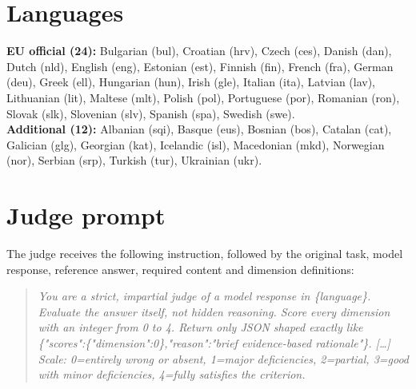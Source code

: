 \documentclass[11pt]{article}
\begin{document}



\appendix
\section{Languages}
\label{app:languages}
\small
\noindent\textbf{EU official (24):} Bulgarian (bul), Croatian (hrv), Czech (ces), Danish (dan), Dutch (nld), English (eng), Estonian (est), Finnish (fin), French (fra), German (deu), Greek (ell), Hungarian (hun), Irish (gle), Italian (ita), Latvian (lav), Lithuanian (lit), Maltese (mlt), Polish (pol), Portuguese (por), Romanian (ron), Slovak (slk), Slovenian (slv), Spanish (spa), Swedish (swe).\\
\textbf{Additional (12):} Albanian (sqi), Basque (eus), Bosnian (bos), Catalan (cat), Galician (glg), Georgian (kat), Icelandic (isl), Macedonian (mkd), Norwegian (nor), Serbian (srp), Turkish (tur), Ukrainian (ukr).
\normalsize

\section{Judge prompt}
\label{app:judge}
The judge receives the following instruction, followed by the original task, model response, reference answer, required content and dimension definitions:
\begin{quote}\small
\textit{You are a strict, impartial judge of a model response in \{language\}. Evaluate the answer itself, not hidden reasoning. Score every dimension with an integer from 0 to 4. Return only JSON shaped exactly like \{"scores":\{"dimension":0\},"reason":"brief evidence-based rationale"\}. [\ldots] Scale: 0=entirely wrong or absent, 1=major deficiencies, 2=partial, 3=good with minor deficiencies, 4=fully satisfies the criterion.}
\end{quote}
\end{document}
